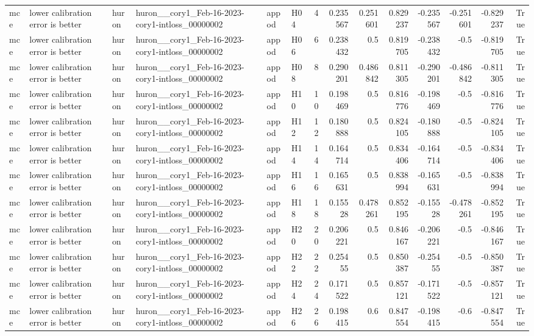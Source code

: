\begin{longtable}{llllllrrrrrrrr}
mce & lower calibration error is better & huron & huron\_\_cory1\_Feb-16-2023-cory1-intloss\_00000002 & appod & H04 & 4 & 0.235567 & 0.251601 & 0.829237 & -0.235567 & -0.251601 & -0.829237 & True \\
mce & lower calibration error is better & huron & huron\_\_cory1\_Feb-16-2023-cory1-intloss\_00000002 & appod & H06 & 6 & 0.238432 & 0.5 & 0.819705 & -0.238432 & -0.5 & -0.819705 & True \\
mce & lower calibration error is better & huron & huron\_\_cory1\_Feb-16-2023-cory1-intloss\_00000002 & appod & H08 & 8 & 0.290201 & 0.486842 & 0.811305 & -0.290201 & -0.486842 & -0.811305 & True \\
mce & lower calibration error is better & huron & huron\_\_cory1\_Feb-16-2023-cory1-intloss\_00000002 & appod & H10 & 10 & 0.198469 & 0.5 & 0.816776 & -0.198469 & -0.5 & -0.816776 & True \\
mce & lower calibration error is better & huron & huron\_\_cory1\_Feb-16-2023-cory1-intloss\_00000002 & appod & H12 & 12 & 0.180888 & 0.5 & 0.824105 & -0.180888 & -0.5 & -0.824105 & True \\
mce & lower calibration error is better & huron & huron\_\_cory1\_Feb-16-2023-cory1-intloss\_00000002 & appod & H14 & 14 & 0.164714 & 0.5 & 0.834406 & -0.164714 & -0.5 & -0.834406 & True \\
mce & lower calibration error is better & huron & huron\_\_cory1\_Feb-16-2023-cory1-intloss\_00000002 & appod & H16 & 16 & 0.165631 & 0.5 & 0.838994 & -0.165631 & -0.5 & -0.838994 & True \\
mce & lower calibration error is better & huron & huron\_\_cory1\_Feb-16-2023-cory1-intloss\_00000002 & appod & H18 & 18 & 0.15528 & 0.478261 & 0.852195 & -0.15528 & -0.478261 & -0.852195 & True \\
mce & lower calibration error is better & huron & huron\_\_cory1\_Feb-16-2023-cory1-intloss\_00000002 & appod & H20 & 20 & 0.206221 & 0.5 & 0.846167 & -0.206221 & -0.5 & -0.846167 & True \\
mce & lower calibration error is better & huron & huron\_\_cory1\_Feb-16-2023-cory1-intloss\_00000002 & appod & H22 & 22 & 0.25455 & 0.5 & 0.850387 & -0.25455 & -0.5 & -0.850387 & True \\
mce & lower calibration error is better & huron & huron\_\_cory1\_Feb-16-2023-cory1-intloss\_00000002 & appod & H24 & 24 & 0.171522 & 0.5 & 0.857121 & -0.171522 & -0.5 & -0.857121 & True \\
mce & lower calibration error is better & huron & huron\_\_cory1\_Feb-16-2023-cory1-intloss\_00000002 & appod & H26 & 26 & 0.198415 & 0.6 & 0.847554 & -0.198415 & -0.6 & -0.847554 & True \\

\end{longtable}
